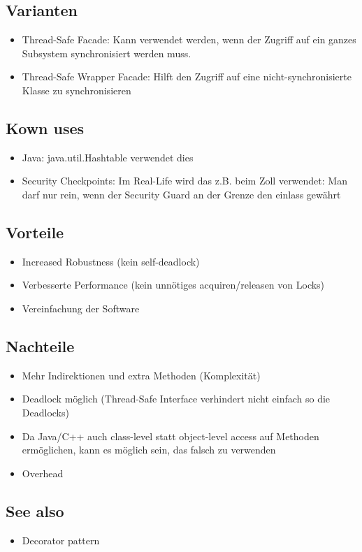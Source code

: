 \subsection{Varianten}

\begin{itemize}
	\item Thread-Safe Facade: Kann verwendet werden, wenn der Zugriff auf ein ganzes Subsystem synchronisiert werden muss.
	\item Thread-Safe Wrapper Facade: Hilft den Zugriff auf eine nicht-synchronisierte Klasse zu synchronisieren
\end{itemize}

\subsection{Kown uses}

\begin{itemize}
	\item Java: java.util.Hashtable verwendet dies
	\item Security Checkpoints: Im Real-Life wird das z.B. beim Zoll verwendet: Man darf nur rein, wenn der Security Guard an der Grenze den einlass gewährt
\end{itemize}

\subsection{Vorteile}

\begin{itemize}
	\item Increased Robustness (kein self-deadlock)
	\item Verbesserte Performance (kein unnötiges acquiren/releasen von Locks)
	\item Vereinfachung der Software
\end{itemize}

\subsection{Nachteile}

\begin{itemize}
	\item Mehr Indirektionen und extra Methoden (Komplexität)
	\item Deadlock möglich (Thread-Safe Interface verhindert nicht einfach so die Deadlocks)
	\item Da Java/C++ auch class-level statt object-level access auf Methoden ermöglichen, kann es möglich sein, das falsch zu verwenden
	\item Overhead
\end{itemize}

\subsection{See also}

\begin{itemize}
	\item Decorator pattern
\end{itemize}

